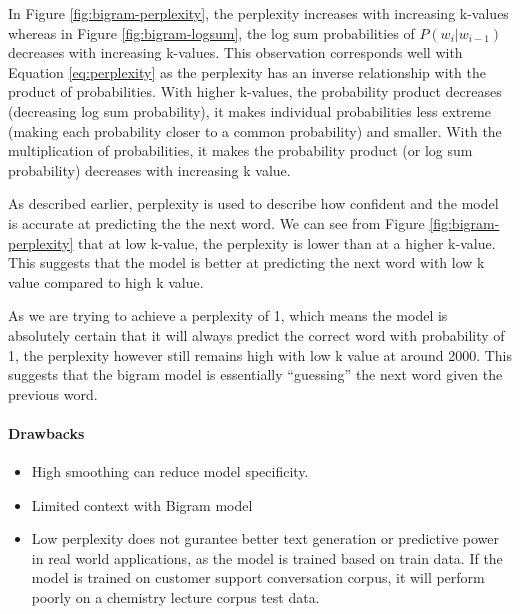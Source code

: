 In Figure \ref{fig:bigram-perplexity}, the perplexity increases with increasing k-values whereas in Figure \ref{fig:bigram-logsum}, the log sum probabilities of $P(w_i | w_{i-1})$ decreases with increasing k-values.
This observation corresponds well with Equation \ref{eq:perplexity} as the perplexity has an inverse relationship with the product of probabilities.
With higher k-values, the probability product decreases (decreasing log sum probability), it makes individual probabilities less extreme (making each probability closer to a common probability) and smaller. 
With the multiplication of probabilities, it makes the probability product (or log sum probability) decreases with increasing k value.

As described earlier, perplexity is used to describe how confident and the model is accurate at predicting the the next word.
We can see from Figure \ref{fig:bigram-perplexity} that at low k-value, the perplexity is lower than at a higher k-value. 
This suggests that the model is better at predicting the next word with low k value compared to high k value. 

As we are trying to achieve a perplexity of 1, which means the model is absolutely certain that it will always predict the correct word with probability of 1,
the perplexity however still remains high with low k value at around 2000. 
This suggests that the bigram model is essentially ``guessing'' the next word given the previous word. 



\paragraph{Drawbacks}
\begin{itemize}
    \item High smoothing can reduce model specificity.
    \item Limited context with Bigram model
    \item Low perplexity does not gurantee better text generation or predictive power in real world applications, as the model is trained based on train data. 
    If the model is trained on customer support conversation corpus, it will perform poorly on a chemistry lecture corpus test data.
\end{itemize}



